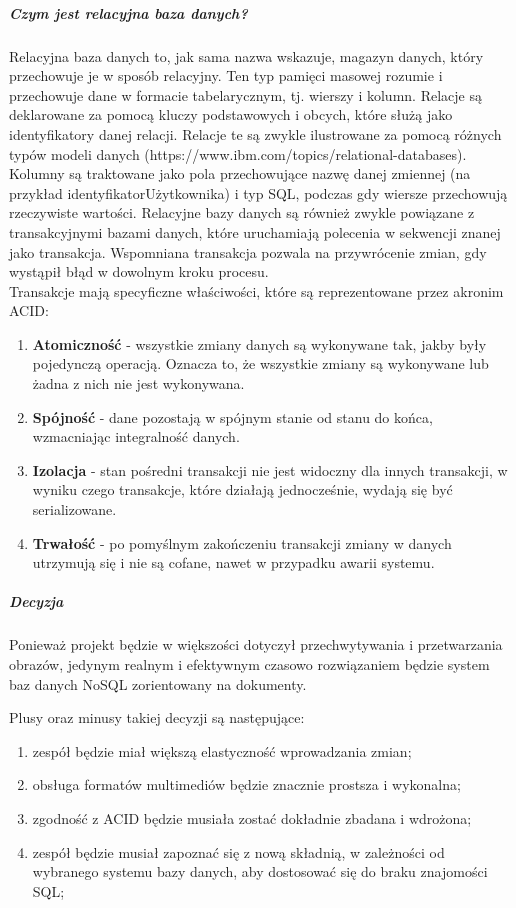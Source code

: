 \documentclass[12pt, a4paper, twoside, openany]{book}
\begin{document}
\subparagraph{Czym jest relacyjna baza danych?\\}
Relacyjna baza danych to, jak sama nazwa wskazuje, magazyn danych, który przechowuje je w sposób relacyjny.
Ten typ pamięci masowej rozumie i przechowuje dane w formacie tabelarycznym, tj. wierszy i kolumn.
Relacje są deklarowane za pomocą kluczy podstawowych i obcych, które służą jako identyfikatory danej relacji.
Relacje te są zwykle ilustrowane za pomocą różnych typów modeli danych (https://www.ibm.com/topics/relational-databases).
Kolumny są traktowane jako pola przechowujące nazwę danej zmiennej (na przykład identyfikatorUżytkownika) i typ SQL, podczas gdy wiersze przechowują rzeczywiste wartości.
Relacyjne bazy danych są również zwykle powiązane z transakcyjnymi bazami danych, które uruchamiają polecenia w sekwencji znanej jako transakcja.
Wspomniana transakcja pozwala na przywrócenie zmian, gdy wystąpił błąd w dowolnym kroku procesu.\\
Transakcje mają specyficzne właściwości, które są reprezentowane przez akronim ACID:
\begin{enumerate}[label=--]
    \item \textbf{Atomiczność} - wszystkie zmiany danych są wykonywane tak, jakby były pojedynczą operacją. Oznacza to, że wszystkie zmiany są wykonywane lub żadna z nich nie jest wykonywana.
    \item \textbf{Spójność} - dane pozostają w spójnym stanie od stanu do końca, wzmacniając integralność danych.
    \item \textbf{Izolacja} - stan pośredni transakcji nie jest widoczny dla innych transakcji, w wyniku czego transakcje, które działają jednocześnie, wydają się być serializowane.
    \item \textbf{Trwałość} - po pomyślnym zakończeniu transakcji zmiany w danych utrzymują się i nie są cofane, nawet w przypadku awarii systemu.
\end{enumerate}


\subparagraph*{Decyzja}

Ponieważ projekt będzie w większości dotyczył przechwytywania i przetwarzania obrazów, jedynym realnym i efektywnym czasowo rozwiązaniem będzie system baz danych NoSQL zorientowany na dokumenty.

Plusy oraz minusy takiej decyzji są następujące:
\begin{enumerate}[label=--]
    \item zespół będzie miał większą elastyczność wprowadzania zmian;
    \item obsługa formatów multimediów będzie znacznie prostsza i wykonalna;
    \item zgodność z ACID będzie musiała zostać dokładnie zbadana i wdrożona;
    \item zespół będzie musiał zapoznać się z nową składnią, w zależności od wybranego systemu bazy danych, aby dostosować się do braku znajomości SQL;
\end{enumerate}
\end{document}
